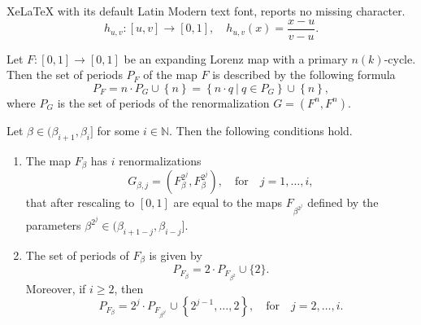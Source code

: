\documentclass[10pt,a4paper]{amsart}
\begin{document}
XeLaTeX with its default Latin Modern text font, reports no missing character.
\begin{equation}
\label{eq:rescaling}
h_{u,v}\colon[u,v]\to[0,1],\quad h_{u,v}(x)=\frac{x-u}{v-u}.
\end{equation}

\begin{lemma}\label{lem:renorm}
    Let $F\colon[0,1]\to[0,1]$ be an expanding Lorenz map with a primary $n(k)$-cycle. Then the set of periods $P_F$ of the map $F$ is described by the following formula
    $$
    P_F=n\cdot P_G\cup\left\lbrace n \right\rbrace=\left\lbrace n\cdot q\:|\: q\in P_G \right\rbrace\cup\left\lbrace n\right\rbrace,
    $$
    where $P_G$ is the set of periods of the renormalization $G=(F^n,F^n)$.
\end{lemma}

\begin{proposition}
\label{prop:beta_seq}
    Let $\beta\in(\beta_{i+1},\beta_i]$ for some $i\in\mathbb{N}$. Then the following conditions hold.
    \begin{enumerate}
    \item\label{prop:beta_seq1} The map $F_{\beta}$ has $i$ renormalizations 
    $$
    G_{\beta,j}=(F^{2^j}_{\beta},F^{2^j}_{\beta}),\quad\text{for}\quad j=1,\ldots,i,
    $$ 
    that after rescaling to $[0,1]$ are equal to the maps $F_{\beta^{2^j}}$ defined by the parameters $\beta^{2^j}\in(\beta_{i+1-j},\beta_{i-j}]$.     
    \item\label{prop:beta_seq2} The set of periods of $F_{\beta}$ is given by
    $$
    P_{F_{\beta}}=2\cdot P_{F_{\beta^{2}}}\cup\{2\}.
    $$
    Moreover, if $i\geq2$, then
    $$
    P_{F_{\beta}}=2^{j}\cdot P_{F_{\beta^{2^j}}}\cup\left\lbrace2^{j-1},\ldots,2\right\rbrace,\quad\text{for}\quad j=2,\ldots,i.
    $$
    \end{enumerate}
\end{proposition}
\end{document}
